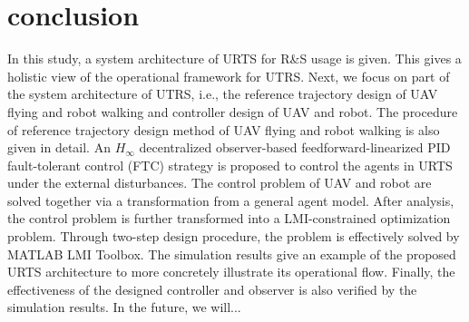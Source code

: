 \documentclass{ieeeaccess}
\begin{document}
\section{conclusion}
In this study, a system architecture of URTS for R\&S usage is given. This gives a holistic view of the operational framework for UTRS. Next, we focus on part of the system architecture of UTRS, i.e., the reference trajectory design of UAV flying and robot walking and controller design of UAV and robot. The procedure of reference trajectory design method of UAV flying and robot walking is also given in detail. An $H_\infty$ decentralized observer-based feedforward-linearized PID fault-tolerant control (FTC) strategy is proposed to control the agents in URTS under the external disturbances. The control problem of UAV and robot are solved together via a transformation from a general agent model. After analysis, the control problem is further transformed into a LMI-constrained optimization problem. Through two-step design procedure, the problem is effectively solved by MATLAB LMI Toolbox. The simulation results give an example of the proposed URTS architecture to more concretely illustrate its operational flow. Finally, the effectiveness of the designed controller and observer is also verified by the simulation results. In the future, we will...





\EOD
\end{document}
